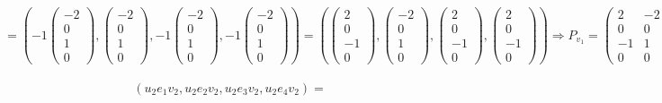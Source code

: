 \documentclass{article}
\begin{document}
$$= \left(-1\begin{pmatrix}-2 \\ 0 \\ 1 \\ 0\end{pmatrix}, \begin{pmatrix}-2 \\ 0 \\ 1 \\ 0\end{pmatrix}, -1\begin{pmatrix}-2 \\ 0 \\ 1 \\ 0\end{pmatrix}, -1\begin{pmatrix}-2 \\ 0 \\ 1 \\ 0\end{pmatrix}\right) = \left(\begin{pmatrix}2 \\ 0 \\ -1 \\ 0\end{pmatrix}, \begin{pmatrix}-2 \\ 0 \\ 1 \\ 0\end{pmatrix}, \begin{pmatrix}2 \\ 0 \\ -1 \\ 0\end{pmatrix}, \begin{pmatrix}2 \\ 0 \\ -1 \\ 0\end{pmatrix}\right) \Rightarrow P_{v_1} = \begin{pmatrix}
2 & -2 & 2 & 2 \\
0 & 0 & 0 & 0 \\
-1 & 1 & -1 & -1 \\
0 & 0 & 0 & 0 
\end{pmatrix} $$ \\
$$\left(u_2e_1v_2, u_2e_2v_2, u_2e_3v_2, u_2e_4v_2\right) =$$
\end{document}
